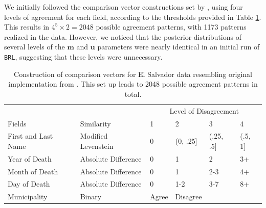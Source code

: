 \documentclass[ba]{imsart}
\begin{document}
	We initially followed the comparison vector constructions set by \cite{sadinle_bayesian_2017}, using four levels of agreement for each field, according to the thresholds provided in Table \ref{Tab:el_salvador_cutoffs_1}. This results in \(4^5 \times 2 = 2048\) possible agreement patterns, with 1173 patterns realized in the data. However, we noticed that the posterior distributions of several levels of the $\bm{m}$ and $\bm{u}$ parameters were nearly identical in an initial run of \texttt{BRL}, suggesting that these levels were unnecessary.
	
	
	
	
	\begin{table}[t]
		\begin{tabular}[t]{llllll}
			\multicolumn{2}{c}{ } & \multicolumn{4}{c}{Level of Disagreement} \\
			\cline{3-6}
			Fields & Similarity & 1 & 2 & 3 & 4\\
			\hline
			First and Last Name & Modified Levenstein & 0 & (0, .25] & (.25, .5] & (.5, 1]\\
			Year of Death & Absolute Difference & 0 & 1 & 2 & 3+\\
			Month of Death & Absolute Difference & 0 & 1 & 2-3 & 4+\\
			Day of Death & Absolute Difference & 0 & 1-2 & 3-7 & 8+\\
			Municipality & Binary & Agree & Disagree &  & \\
			\hline
		\end{tabular}
		\caption{Construction of comparison vectors for El Salvador data resembling original implementation from \cite{sadinle_bayesian_2017}. This set up leads to 2048 possible agreement patterns in total.}\label{Tab:el_salvador_cutoffs_1}
	\end{table}
\end{document}
